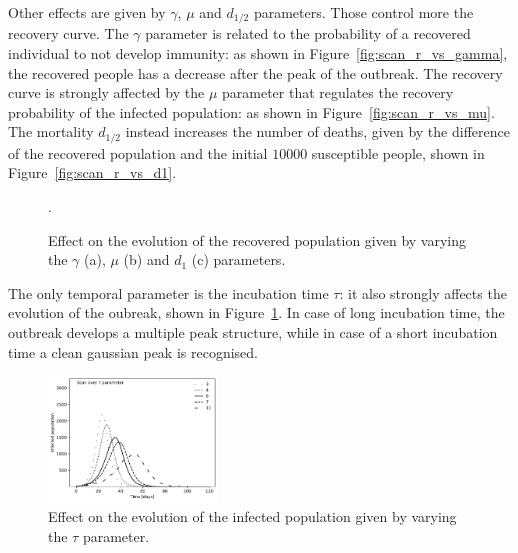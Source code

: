 Other effects are given by $\gamma$, $\mu$ and $d_{1/2}$ parameters. Those control more the recovery curve. The $\gamma$ parameter is related to the probability of a recovered individual to not develop immunity: as shown in Figure~\ref{fig:scan_r_vs_gamma}, the recovered people has a decrease after the peak of the outbreak. The recovery curve is strongly affected by the $\mu$ parameter that regulates the recovery probability of the infected population: as shown in Figure~\ref{fig:scan_r_vs_mu}. The mortality $d_{1/2}$ instead increases the number of deaths, given by the difference of the recovered population and the initial $10000$ susceptible people, shown in Figure~\ref{fig:scan_r_vs_d1}.

\begin{figure}[!ht]\centering
{}
\caption{Effect on the evolution of the recovered population given by varying the $\gamma$ (a), $\mu$ (b) and $d_1$ (c) parameters.}.
\end{figure}

The only temporal parameter is the incubation time $\tau$: it also strongly affects the evolution of the oubreak, shown in Figure~\ref{fig:scan_i_vs_tau}. In case of long incubation time, the outbreak develops a  multiple peak structure, while in case of a short incubation time a clean gaussian peak is recognised.

\begin{figure}[!ht]\centering
\includegraphics[width=0.4\textwidth]{imgs/ModelDescription/Scan_I_vs_tau_parameters_alternative.pdf}
\caption{Effect on the evolution of the infected population given by varying the $\tau$ parameter.}
\label{fig:scan_i_vs_tau}
\end{figure}

